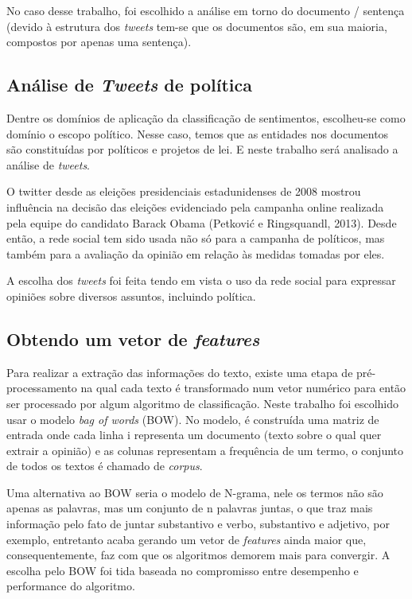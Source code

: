 No caso desse trabalho, foi escolhido a análise em torno do documento / sentença (devido à estrutura
dos \textit{tweets} tem-se que os documentos são, em sua maioria, compostos por apenas uma 
sentença). 

\subsection{Análise de \textit{Tweets} de política}

Dentre os domínios de aplicação da classificação de sentimentos, escolheu-se como domínio o
escopo político. Nesse caso, temos que as entidades nos documentos são constituídas por
políticos e projetos de lei. E neste trabalho será analisado a análise de \textit{tweets}.

O twitter desde as eleições presidenciais estadunidenses de 2008 mostrou influência
na decisão das eleições evidenciado pela campanha online realizada pela equipe do
candidato Barack Obama (Petković e Ringsquandl, 2013)\citep{petkovic2013}. Desde então, 
a rede social tem sido usada não só para a campanha de políticos, mas também para a avaliação
da opinião em relação às medidas tomadas por eles.

A escolha dos \textit{tweets} foi feita tendo em vista o uso da rede social 
para expressar opiniões sobre diversos assuntos, incluindo política.


\subsection{Obtendo um vetor de \textit{features}}
\label{subsec:featurization}

Para realizar a extração das informações do texto, existe uma etapa de pré-processamento na qual
cada texto é transformado num vetor numérico para então ser processado por algum algoritmo de
classificação. Neste trabalho foi escolhido usar o modelo \textit{bag of words} (BOW). No modelo, 
é construída uma matriz de entrada onde cada linha i representa um documento (texto sobre o qual
quer extrair a opinião) e as colunas representam a frequência de um termo, o conjunto de todos os textos é chamado de \textit{corpus}.

Uma alternativa ao BOW seria o modelo de N-grama, nele os termos não são apenas as palavras, mas
um conjunto de n palavras juntas, o que traz mais informação pelo fato de juntar substantivo e verbo, substantivo e adjetivo, por exemplo, entretanto acaba gerando um vetor de \textit{features}
ainda maior que, consequentemente, faz com que os algoritmos demorem mais para convergir.
A escolha pelo BOW foi tida baseada no compromisso entre desempenho e performance do algoritmo.

